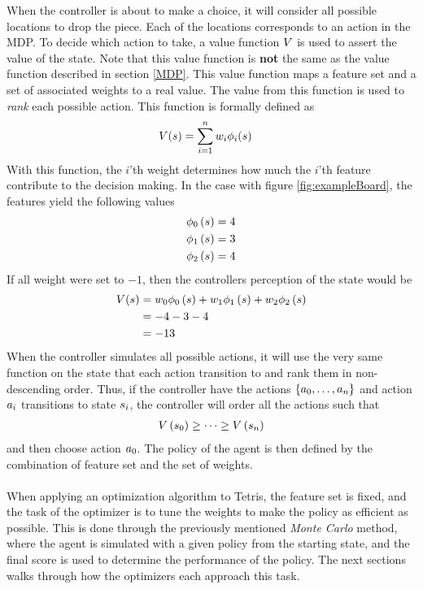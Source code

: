 When the controller is about to make a choice, it will
consider all possible locations to drop the piece. Each
of the locations corresponds to an action in the MDP.
To decide which action to take, a value function $V$
is used to assert the value of the state. Note that 
this value function is \textbf{not} the same as the value 
function described in section \ref{MDP}. This value function
maps a feature set and a set of associated weights to a real value.
The value from this function is used to \textit{rank} each possible action.
This function is formally defined as
\begin{align}
V (s ) &= 
\sum_{i=1}^{n} w _{i}\phi _{i}(s )
\end{align}
With this function, the $i$'th weight determines how
much the $i$'th feature contribute to the decision making.
In the case with figure \ref{fig:exampleBoard}, the features yield
the following values
\begin{align}
\phi_0 \left( s \right) = 4\\
\phi_1 \left( s \right) = 3\\
\phi_2 \left( s \right) = 4
\end{align}
If all weight were set to $-1$, then the controllers perception 
of the state would be
\begin{align}
V (s ) &= 
w_0 \phi_0 \left( s \right) + 
w_1 \phi_1 \left( s \right) + 
w_2 \phi_2 \left( s \right)\\
&= -4 -3 -4\\
&= -13
\end{align}
When the controller simulates all possible actions, it will
use the very same function on the state that each action transition 
to and rank them in non-descending order. Thus, if the controller
have the actions $\{a_0,\dots,a_n\}$ and action 
$a_i$ transitions to state $s_i$, the controller will
order all the actions such that
\begin{align}
V \left( s_0 \right) \geq \dots \geq 
V \left( s_n \right)
\end{align} 
and then choose action $a_0$. The policy of the agent 
is then defined by the combination of feature set and the set of weights.\\
\\
When applying an optimization algorithm to Tetris, the feature set is 
fixed, and the task of the optimizer is to tune the weights to make the 
policy as efficient as possible. This is done through the previously 
mentioned \textit{Monte Carlo} method, where the agent is simulated
with a given policy from the starting state, and the final score is 
used to determine the performance of the policy. The next sections 
walks through how the optimizers each approach this task.


